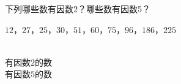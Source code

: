 下列哪些数有因数2？哪些数有因数5？ \\
\centerline{$12$，$27$，$25$，$30$，$51$，$60$，$75$，$96$，$186$，$225$}\\
有因数$2$的数\key{\hspace{16em}}\\
有因数$5$的数\key{\hspace{16em}}\\